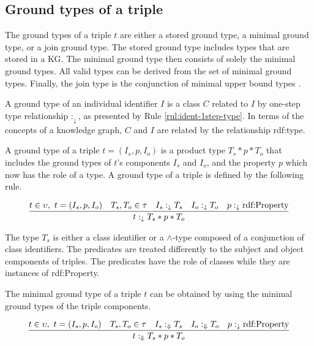 \documentclass[runningheads]{llncs}
\newcommand{\darr}{\downarrow}
\newcommand{\Darr}{\Downarrow}
\begin{document}
\subsection{Ground types of a triple\label{sec:3-ground-types}}

%
% 

\noindent
The ground types of a triple $t$ are either a stored ground type, a
minimal ground type, or a join ground type. The stored ground type
includes types that are stored in a KG. The minimal ground type then
consists of solely the minimal ground types. All valid types can be
derived from the set of minimal ground types. Finally, the join type
is the conjunction of minimal upper bound types \cite{Knudstorp2024}.
 
A ground type of an individual identifier $I$ is a class $C$ related
to $I$ by one-step type relationship $:_\darr$, as presented by Rule
\ref{rul:ident-1step-type}. In terms of the concepts of a knowledge
graph, $C$ and $I$ are related by the relationship rdf:type.

A ground type of a triple $t=(I_s,p,I_o)$ is a product type
$T_s*p*T_o$ that includes the ground types of $t$'s components $I_s$
and $I_o$, and the property $p$ which now has the role of a type. A
ground type of a triple is defined by the following rule.

\begin{equation}
\label{rul:3-ground}
\dfrac{t\in\upsilon,\ t=(I_s,p,I_o)\quad T_s,T_o\in\tau\quad I_s:_\darr\/T_s\quad I_o:_\darr\/T_o\quad p:_\darr\text{rdf:Property}}
      {t:_\darr\/T_s*p*T_o}
\end{equation}

The type $T_s$ is either a class identifier or a $\land$-type composed
of a conjunction of class identifiers. The predicates are treated
differently to the subject and object components of triples. The
predicates have the role of classes while they are instances of
rdf:Property.

The minimal ground type of a triple $t$ can be obtained by using the
minimal ground types of the triple components. 

\begin{equation}
\label{rul:3-min-ground}
\dfrac{t\in\upsilon,\ t=(I_s,p,I_o)\quad T_s,T_o\in\tau\quad I_s:_\Darr\/T_s\quad I_o:_\Darr\/T_o\quad p:_\darr\text{rdf:Property}}
      {t:_\Darr\/T_s*p*T_o}
\end{equation}
\end{document}
